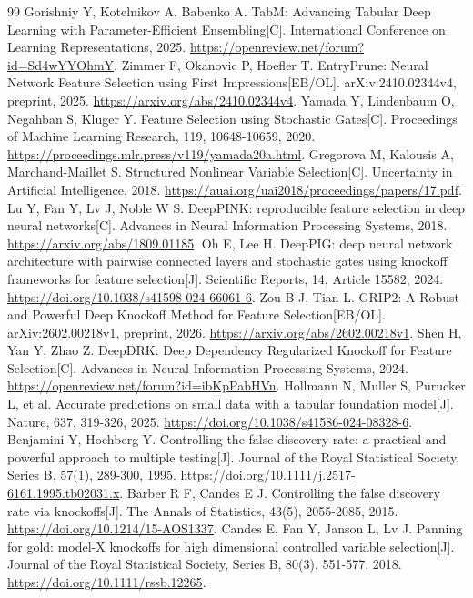 \documentclass[UTF8,11pt,a4paper]{ctexart}
\begin{document}
\begin{thebibliography}{99}
 Gorishniy Y, Kotelnikov A, Babenko A. TabM: Advancing Tabular Deep Learning with Parameter-Efficient Ensembling[C]. International Conference on Learning Representations, 2025. \url{https://openreview.net/forum?id=Sd4wYYOhmY}.
 Zimmer F, Okanovic P, Hoefler T. EntryPrune: Neural Network Feature Selection using First Impressions[EB/OL]. arXiv:2410.02344v4, preprint, 2025. \url{https://arxiv.org/abs/2410.02344v4}.
 Yamada Y, Lindenbaum O, Negahban S, Kluger Y. Feature Selection using Stochastic Gates[C]. Proceedings of Machine Learning Research, 119, 10648-10659, 2020. \url{https://proceedings.mlr.press/v119/yamada20a.html}.
 Gregorova M, Kalousis A, Marchand-Maillet S. Structured Nonlinear Variable Selection[C]. Uncertainty in Artificial Intelligence, 2018. \url{https://auai.org/uai2018/proceedings/papers/17.pdf}.
 Lu Y, Fan Y, Lv J, Noble W S. DeepPINK: reproducible feature selection in deep neural networks[C]. Advances in Neural Information Processing Systems, 2018. \url{https://arxiv.org/abs/1809.01185}.
 Oh E, Lee H. DeepPIG: deep neural network architecture with pairwise connected layers and stochastic gates using knockoff frameworks for feature selection[J]. Scientific Reports, 14, Article 15582, 2024. \url{https://doi.org/10.1038/s41598-024-66061-6}.
 Zou B J, Tian L. GRIP2: A Robust and Powerful Deep Knockoff Method for Feature Selection[EB/OL]. arXiv:2602.00218v1, preprint, 2026. \url{https://arxiv.org/abs/2602.00218v1}.
 Shen H, Yan Y, Zhao Z. DeepDRK: Deep Dependency Regularized Knockoff for Feature Selection[C]. Advances in Neural Information Processing Systems, 2024. \url{https://openreview.net/forum?id=ibKpPabHVn}.
 Hollmann N, Muller S, Purucker L, et al. Accurate predictions on small data with a tabular foundation model[J]. Nature, 637, 319-326, 2025. \url{https://doi.org/10.1038/s41586-024-08328-6}.
 Benjamini Y, Hochberg Y. Controlling the false discovery rate: a practical and powerful approach to multiple testing[J]. Journal of the Royal Statistical Society, Series B, 57(1), 289-300, 1995. \url{https://doi.org/10.1111/j.2517-6161.1995.tb02031.x}.
 Barber R F, Candes E J. Controlling the false discovery rate via knockoffs[J]. The Annals of Statistics, 43(5), 2055-2085, 2015. \url{https://doi.org/10.1214/15-AOS1337}.
 Candes E, Fan Y, Janson L, Lv J. Panning for gold: model-X knockoffs for high dimensional controlled variable selection[J]. Journal of the Royal Statistical Society, Series B, 80(3), 551-577, 2018. \url{https://doi.org/10.1111/rssb.12265}.

\end{thebibliography}
\end{document}
